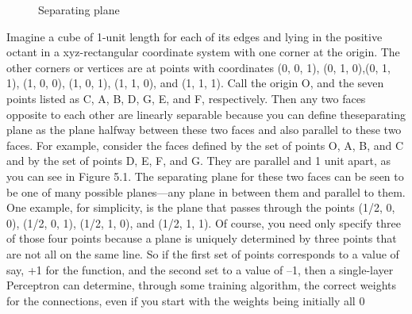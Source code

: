 \newcommand{\Depth}{4}
\newcommand{\Height}{4}
\newcommand{\Width}{4}
\begin{figure}
\centering
\caption{Separating plane}
\label{fig:separating_plane}
\end{figure}

Imagine a cube of 1-unit length for each of its edges and lying in the positive octant in a xyz-rectangular coordinate system with one corner at the origin.
The other corners or vertices are at points with coordinates (0, 0, 1), (0, 1, 0),(0, 1, 1), (1, 0, 0), (1, 0, 1), (1, 1, 0), and (1, 1, 1). Call the origin O, and the seven points listed as C, A, B, D, G, E, and F, respectively. Then any two faces
opposite to each other are linearly separable because you can define theseparating plane as the plane halfway between these two faces and also parallel to these two faces.
For example, consider the faces defined by the set of points O, A, B, and C and
by the set of points D, E, F, and G. They are parallel and 1 unit apart, as you
can see in Figure 5.1. The separating plane for these two faces can be seen to
be one of many possible planes—any plane in between them and parallel to
them. One example, for simplicity, is the plane that passes through the points
(1/2, 0, 0), (1/2, 0, 1), (1/2, 1, 0), and (1/2, 1, 1). Of course, you need only
specify three of those four points because a plane is uniquely determined by
three points that are not all on the same line. So if the first set of points
corresponds to a value of say, +1 for the function, and the second set to a value
of –1, then a single-layer Perceptron can determine, through some training
algorithm, the correct weights for the connections, even if you start with the
weights being initially all 0

